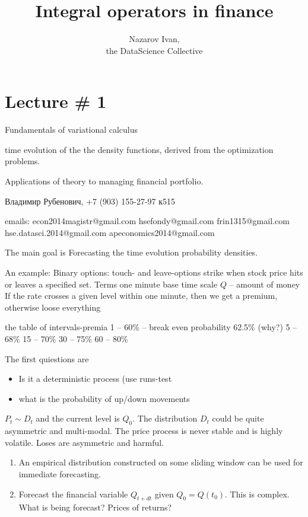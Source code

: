 \documentclass[a4paper]{article}
\title{Integral operators in finance}
\author{Nazarov Ivan, \rus{101мНОД(ИССА)}\\the DataScience Collective}
\newcommand{\rus}[1]{\foreignlanguage{russian}{#1}}
\begin{document}
\maketitle

\section{Lecture \# 1} %
\label{sec:lecture_1}

Fundamentals of variational calculus

time evolution of the the density functions, derived from the optimization problems.

Applications of theory to managing financial portfolio.

\rus{Владимир Рубенович, +7 (903) 155-27-97 к515 }

emails:
econ2014magistr@gmail.com
hsefondy@gmail.com
frin1315@gmail.com
hse.datasci.2014@gmail.com
apeconomics2014@gmail.com


The main goal is Forecasting the time evolution probability densities.

An example:
Binary options: touch- and leave-options strike when stock price hits or leaves a specified set.
	Terms one minute base time scale
	$Q$ -- amount of money
	If the rate crosses a given level within one minute, then we get a premium, otherwise loose everything

the table of intervals-premia
	 1 -- 60\% -- break even probability 62.5\% (why?)
	 5 -- 68\%
	15 -- 70\%
	30 -- 75\%
	60 -- 80\%

The first quiestions are \begin{itemize}
	\item Is it a deterministic process (use runs-test
	\item what is the probability of up/down movements
\end{itemize}

$P_t\sim D_t$ and the current level is $Q_0$.
The distribution $D_t$ could be quite asymmetric and multi-modal.
The price process is never stable and is highly volatile.
Loses are asymmetric and harmful.

\begin{enumerate}
	\item An empirical distribution constructed on some sliding window can be used for immediate forecasting.
	\item Forecast the financial variable $Q_{t+dt}$ given $Q_0 = Q(t_0)$. This is complex.
	What is being forecast? Prices of returns?
\end{enumerate}
\end{document}
